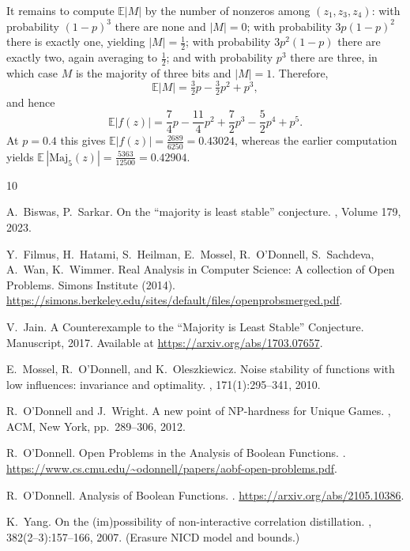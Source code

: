 \documentclass[11pt]{article}
\newcommand{\Maj}{\mathrm{Maj}}
\begin{document}
It remains to compute $\mathbb{E}|M|$ by the number of nonzeros among $(z_1,z_3,z_4)$: with probability $(1-p)^3$ there are none and $|M|=0$; with probability $3p(1-p)^2$ there is exactly one, yielding $|M|=\tfrac12$; with probability $3p^2(1-p)$ there are exactly two, again averaging to $\tfrac12$; and with probability $p^3$ there are three, in which case $M$ is the majority of three bits and $|M|=1$. Therefore,
\[
\mathbb{E}|M|=\tfrac32p-\tfrac32p^2+p^3,
\]
and hence
\[
\mathbb{E}|f(z)|
=\frac{7}{4}p-\frac{11}{4}p^2+\frac{7}{2}p^3-\frac{5}{2}p^4+p^5.
\]
At $p=0.4$ this gives $\mathbb{E}|f(z)|=\frac{2689}{6250}=0.43024$, whereas the earlier computation yields $\mathbb{E}\,|\Maj_5(z)|=\frac{5363}{12500}=0.42904$.

\normalsize


\begin{thebibliography}{10}

A.~Biswas, P.~Sarkar.
\newblock On the ``majority is least stable'' conjecture.
, Volume 179, 2023.

Y.~Filmus, H.~Hatami, S.~Heilman, E.~Mossel, R.~O'Donnell, S.~Sachdeva, A.~Wan, K.~Wimmer.
\newblock Real Analysis in Computer Science: A collection of Open Problems.
\newblock Simons Institute (2014). \url{https://simons.berkeley.edu/sites/default/files/openprobsmerged.pdf}.

V.~Jain.
\newblock A Counterexample to the ``Majority is Least Stable'' Conjecture.
\newblock Manuscript, 2017.
\newblock Available at \url{https://arxiv.org/abs/1703.07657}.

E.~Mossel, R.~O'Donnell, and K.~Oleszkiewicz.
\newblock Noise stability of functions with low influences: invariance and optimality.
, 171(1):295--341, 2010.

R.~O'Donnell and J.~Wright.
\newblock A new point of {NP}-hardness for Unique Games.
, ACM, New York, pp.~289--306, 2012.

R.~O'Donnell.
\newblock Open Problems in the Analysis of Boolean Functions.
. \url{https://www.cs.cmu.edu/~odonnell/papers/aobf-open-problems.pdf}.

R.~O'Donnell.
\newblock Analysis of Boolean Functions.
. \url{https://arxiv.org/abs/2105.10386}.

K.~Yang.
\newblock On the (im)possibility of non-interactive correlation distillation.
, 382(2--3):157--166, 2007.
\newblock (Erasure NICD model and bounds.)
\end{thebibliography}
\end{document}
